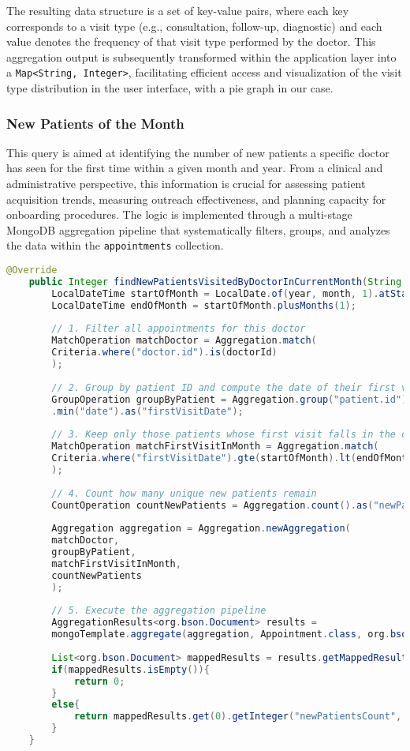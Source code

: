 The resulting data structure is a set of key-value pairs, where each key corresponds to a visit type (e.g., consultation, follow-up, diagnostic) and each value denotes the frequency of that visit type performed by the doctor. This aggregation output is subsequently transformed within the application layer into a \texttt{Map<String, Integer>}, facilitating efficient access and visualization of the visit type distribution in the user interface, with a pie graph in our case.

\subsubsection{New Patients of the Month}
This query is aimed at identifying the number of new patients a specific doctor has seen for the first time within a given month and year. From a clinical and administrative perspective, this information is crucial for assessing patient acquisition trends, measuring outreach effectiveness, and planning capacity for onboarding procedures. The logic is implemented through a multi-stage MongoDB aggregation pipeline that systematically filters, groups, and analyzes the data within the \texttt{appointments} collection.

\begin{lstlisting}[language=java, caption={Java code for the New Patients of the Month analytic}]
	@Override
	public Integer findNewPatientsVisitedByDoctorInCurrentMonth(String doctorId, Integer year, Integer month){
		LocalDateTime startOfMonth = LocalDate.of(year, month, 1).atStartOfDay();
		LocalDateTime endOfMonth = startOfMonth.plusMonths(1);
		
		// 1. Filter all appointments for this doctor
		MatchOperation matchDoctor = Aggregation.match(
		Criteria.where("doctor.id").is(doctorId)
		);
		
		// 2. Group by patient ID and compute the date of their first visit
		GroupOperation groupByPatient = Aggregation.group("patient.id")
		.min("date").as("firstVisitDate");
		
		// 3. Keep only those patients whose first visit falls in the current month
		MatchOperation matchFirstVisitInMonth = Aggregation.match(
		Criteria.where("firstVisitDate").gte(startOfMonth).lt(endOfMonth)
		);
		
		// 4. Count how many unique new patients remain
		CountOperation countNewPatients = Aggregation.count().as("newPatientsCount");
		
		Aggregation aggregation = Aggregation.newAggregation(
		matchDoctor,
		groupByPatient,
		matchFirstVisitInMonth,
		countNewPatients
		);
		
		// 5. Execute the aggregation pipeline
		AggregationResults<org.bson.Document> results =
		mongoTemplate.aggregate(aggregation, Appointment.class, org.bson.Document.class);
		
		List<org.bson.Document> mappedResults = results.getMappedResults();
		if(mappedResults.isEmpty()){
			return 0;
		}
		else{
			return mappedResults.get(0).getInteger("newPatientsCount", 0);
		}
	}
\end{lstlisting}

